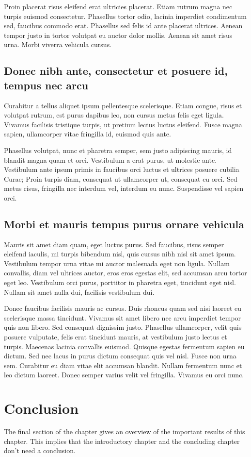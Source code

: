 Proin placerat risus eleifend erat ultricies placerat. Etiam rutrum magna
nec turpis euismod consectetur. Phasellus tortor odio, lacinia imperdiet
condimentum sed, faucibus commodo erat. Phasellus sed felis id ante
placerat ultrices. Aenean tempor justo in tortor volutpat eu auctor dolor
mollis. Aenean sit amet risus urna. Morbi viverra vehicula cursus.

\subsection{Donec nibh ante, consectetur et posuere id, tempus nec arcu}
Curabitur a tellus aliquet ipsum pellentesque scelerisque. Etiam congue,
risus et volutpat rutrum, est purus dapibus leo, non cursus metus felis
eget ligula. Vivamus facilisis tristique turpis, ut pretium lectus luctus
eleifend. Fusce magna sapien, ullamcorper vitae fringilla id, euismod quis
ante.

Phasellus volutpat, nunc et pharetra semper, sem justo adipiscing mauris,
id blandit magna quam et orci. Vestibulum a erat purus, ut molestie ante.
Vestibulum ante ipsum primis in faucibus orci luctus et ultrices posuere
cubilia Curae; Proin turpis diam, consequat ut ullamcorper ut, consequat eu
orci. Sed metus risus, fringilla nec interdum vel, interdum eu nunc.
Suspendisse vel sapien orci.

\subsection{Morbi et mauris tempus purus ornare vehicula}
Mauris sit amet diam quam, eget luctus purus. Sed faucibus, risus semper
eleifend iaculis, mi turpis bibendum nisl, quis cursus nibh nisl sit amet
ipsum. Vestibulum tempor urna vitae mi auctor malesuada eget non ligula.
Nullam convallis, diam vel ultrices auctor, eros eros egestas elit, sed
accumsan arcu tortor eget leo. Vestibulum orci purus, porttitor in pharetra
eget, tincidunt eget nisl. Nullam sit amet nulla dui, facilisis vestibulum
dui.

Donec faucibus facilisis mauris ac cursus. Duis rhoncus quam sed nisi
laoreet eu scelerisque massa tincidunt. Vivamus sit amet libero nec arcu
imperdiet tempor quis non libero. Sed consequat dignissim justo. Phasellus
ullamcorper, velit quis posuere vulputate, felis erat tincidunt mauris, at
vestibulum justo lectus et turpis. Maecenas lacinia convallis euismod.
Quisque egestas fermentum sapien eu dictum. Sed nec lacus in purus dictum
consequat quis vel nisl. Fusce non urna sem. Curabitur eu diam vitae elit
accumsan blandit. Nullam fermentum nunc et leo dictum laoreet. Donec semper
varius velit vel fringilla. Vivamus eu orci nunc.

\section{Conclusion}
The final section of the chapter gives an overview of the important results
of this chapter. This implies that the introductory chapter and the
concluding chapter don't need a conclusion.

\lipsum[66]

